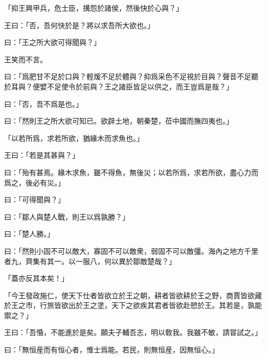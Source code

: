 「抑王興甲兵，危士臣，搆怨於諸侯，然後快於心與？」

王曰：「否，吾何快於是？將以求吾所大欲也。」

曰：「王之所大欲可得聞與？」

王笑而不言。

曰：「爲肥甘不足於口與？輕煖不足於體與？抑爲采色不足視於目與？聲音不足聽於耳與？便嬖不足使令於前與？王之諸臣皆足以供之，而王豈爲是哉？」

曰：「否，吾不爲是也。」

曰：「然則王之所大欲可知已。欲辟土地，朝秦楚，莅中國而撫四夷也。」

「以若所爲，求若所欲，猶緣木而求魚也。」

王曰：「若是其甚與？」

曰：「殆有甚焉。緣木求魚，雖不得魚，無後災；以若所爲，求若所欲，盡心力而爲之，後必有災。」

曰：「可得聞與？」

曰：「鄒人與楚人戰，則王以爲孰勝？」

曰：「楚人勝。」

曰：「然則小固不可以敵大，寡固不可以敵衆，弱固不可以敵彊。海內之地方千里者九，齊集有其一。以一服八，何以異於鄒敵楚哉？」

「蓋亦反其本矣！」

「今王發政施仁，使天下仕者皆欲立於王之朝，耕者皆欲耕於王之野，商賈皆欲藏於王之市，行旅皆欲出於王之塗，天下之欲疾其君者皆欲赴愬於王。其若是，孰能禦之？」

王曰：「吾惛，不能進於是矣。願夫子輔吾志，明以敎我。我雖不敏，請甞試之。」

曰：「無恒産而有恒心者，惟士爲能。若民，則無恒産，因無恒心。」

